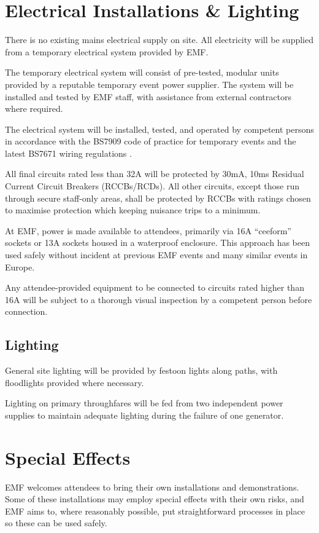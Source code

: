 \section{Electrical Installations \& Lighting}\label{power}

There is no existing mains electrical supply on site. All electricity will be
supplied from a temporary electrical system provided by EMF.

The temporary electrical system will consist of pre-tested, modular units
provided by a reputable temporary event power supplier. The system will be
installed and tested by EMF staff, with assistance from external contractors
where required.

The electrical system will be installed, tested, and operated by competent
persons in accordance with the BS7909 code of practice for temporary events
\cite{bs7909} and the latest BS7671 wiring regulations \cite{bs7671}.

All final circuits rated less than 32A will be protected by 30mA, 10ms Residual
Current Circuit Breakers (RCCBs/RCDs).  All other circuits, except those run
through secure staff-only areas, shall be protected by RCCBs with ratings chosen
to maximise protection which keeping nuisance trips to a minimum.

At EMF, power is made available to attendees, primarily via 16A ``ceeform''
sockets or 13A sockets housed in a waterproof enclosure. This approach has been
used safely without incident at previous EMF events and many similar events in Europe.

Any attendee-provided equipment to be connected to circuits rated higher than 16A
will be subject to a thorough visual inspection by a competent person before connection.

\subsection{Lighting}
General site lighting will be provided by festoon lights along paths,
with floodlights provided where necessary.

Lighting on primary throughfares will be fed from two independent power supplies
to maintain adequate lighting during the failure of one generator.

\newpage

\section{Special Effects}
EMF welcomes attendees to bring their own installations and demonstrations.
Some of these installations may employ special effects with their own risks,
and EMF aims to, where reasonably possible, put straightforward processes in
place so these can be used safely. 

